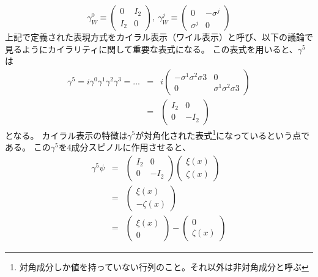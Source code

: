 \begin{equation}
  \gamma_W^0 \equiv
  \left(
    \begin{array}{cc}
      0   & I_2 \\
      I_2 & 0 
    \end{array}
  \right)
    ,~
  \gamma_W^j \equiv
  \left(
    \begin{array}{cc}
      0        & -\sigma^j \\
      \sigma^j & 0 
    \end{array}
  \right)
\end{equation}
上記で定義された表現方式をカイラル表示（ワイル表示）と呼び、以下の議論で見るようにカイラリティに関して重要な表式になる。
この表式を用いると、$\gamma^5$は
\begin{eqnarray}
  \gamma^5 = i\gamma^0\gamma^1\gamma^2\gamma^3 = ... &=& 
  i 
  \left(
    \begin{array}{cc}
      -\sigma^1\sigma^2\sigma3  & 0 \\
      0                         & \sigma^1\sigma^2\sigma3 
    \end{array}
  \right)\\
  &=& 
  \left(
    \begin{array}{cc}
      I_2 & 0 \\
      0   & -I_2
    \end{array}
  \right)
\end{eqnarray}
となる。
カイラル表示の特徴は$\gamma^5$が対角化された表式\footnote{対角成分しか値を持っていない行列のこと。それ以外は非対角成分と呼ぶ}になっているという点である。
この$\gamma^5$を4成分スピノルに作用させると、
\begin{eqnarray}
  \gamma^5\psi &=& 
  \left(
    \begin{array}{cc}
      I_2 & 0 \\
      0   & -I_2
    \end{array}
  \right)
  \left(
    \begin{array}{c}
      \xi(x) \\
      \zeta(x)
    \end{array}
  \right)\\
  &=&
  \left(
    \begin{array}{c}
      \xi(x) \\
      -\zeta(x)
    \end{array}
  \right)\\
  &=&
  \left(
    \begin{array}{c}
      \xi(x) \\
      0
    \end{array}
  \right) - 
  \left(
    \begin{array}{c}
      0 \\
      \zeta(x)
    \end{array}
  \right)
\end{eqnarray}
